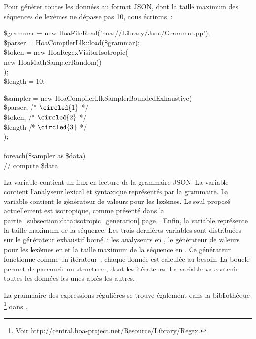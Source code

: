 \begin{example}

Pour générer toutes les données au format JSON, dont la taille maximum des
séquences de lexèmes ne dépasse pas 10, nous écrirons~:
%
\begin{pre}
\$grammar = new Hoa\bslash{}File\bslash{}Read('hoa://Library/Json/Grammar.pp'); \\
\$parser  = Hoa\bslash{}Compiler\bslash{}Llk::load(\$grammar); \\
\$token   = new Hoa\bslash{}Regex\bslash{}Visitor\bslash{}Isotropic( \\
    new Hoa\bslash{}Math\bslash{}Sampler\bslash{}Random() \\
); \\
\$length  = 10;
\end{pre}
\begin{pre}
\$sampler = new Hoa\bslash{}Compiler\bslash{}Llk\bslash{}Sampler\bslash{}BoundedExhaustive( \\
    \$parser, /* \(\circled{1}\) */ \\
    \$token,  /* \(\circled{2}\) */ \\
    \$length  /* \(\circled{3}\) */ \\
); \\
 \\
foreach(\$sampler as \$data) \\
    // compute \$data
\end{pre}
%
La variable  contient un flux en lecture de la grammaire JSON.
La variable  contient l'analyseur lexical et syntaxique
représentés par la grammaire. La variable  contient le générateur
de valeurs pour les lexèmes. Le seul proposé actuellement est isotropique, comme
présenté dans la partie~\ref{subsection:data:isotropic_generation}
page~\pageref{subsection:data:isotropic_generation}. Enfin, la variable
 représente la taille maximum de la séquence. Les trois dernières
variables sont distribuées sur le générateur exhaustif borné~: les analyseurs en
, le générateur de valeurs pour les lexèmes en  et la
taille maximum de la séquence en . Ce générateur fonctionne comme un
itérateur~: chaque donnée est calculée au besoin. La boucle 
permet de parcourir un structure , dont les itérateurs.
La variable  va contenir toutes les données les unes après les
autres.

\end{example}

La grammaire des expressions régulières se trouve également dans la bibliothèque
\footnote{Voir
\url{http://central.hoa-project.net/Resource/Library/Regex}.} dans
.

